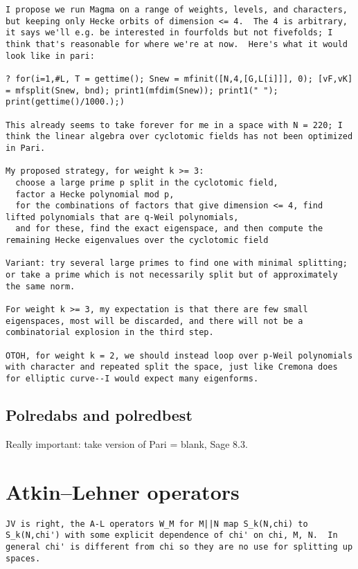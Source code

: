 \documentclass[11pt]{amsart}
\numberwithin{equation}{subsection}
\theoremstyle{definition}
\begin{document}
\begin{verbatim}
I propose we run Magma on a range of weights, levels, and characters,
but keeping only Hecke orbits of dimension <= 4.  The 4 is arbitrary,
it says we'll e.g. be interested in fourfolds but not fivefolds; I
think that's reasonable for where we're at now.  Here's what it would
look like in pari:

? for(i=1,#L, T = gettime(); Snew = mfinit([N,4,[G,L[i]]], 0); [vF,vK]
= mfsplit(Snew, bnd); print1(mfdim(Snew)); print1(" ");
print(gettime()/1000.);)

This already seems to take forever for me in a space with N = 220; I
think the linear algebra over cyclotomic fields has not been optimized
in Pari.

My proposed strategy, for weight k >= 3:
  choose a large prime p split in the cyclotomic field,
  factor a Hecke polynomial mod p,
  for the combinations of factors that give dimension <= 4, find
lifted polynomials that are q-Weil polynomials,
  and for these, find the exact eigenspace, and then compute the
remaining Hecke eigenvalues over the cyclotomic field

Variant: try several large primes to find one with minimal splitting;
or take a prime which is not necessarily split but of approximately
the same norm.

For weight k >= 3, my expectation is that there are few small
eigenspaces, most will be discarded, and there will not be a
combinatorial explosion in the third step.

OTOH, for weight k = 2, we should instead loop over p-Weil polynomials
with character and repeated split the space, just like Cremona does
for elliptic curve--I would expect many eigenforms.
\end{verbatim}

\subsection{Polredabs and polredbest}

Really important: take version of Pari = blank, Sage 8.3.

\section{Atkin--Lehner operators}

\begin{verbatim}
JV is right, the A-L operators W_M for M||N map S_k(N,chi) to S_k(N,chi') with some explicit dependence of chi' on chi, M, N.  In general chi' is different from chi so they are no use for splitting up spaces.
\end{verbatim}
\end{document}
